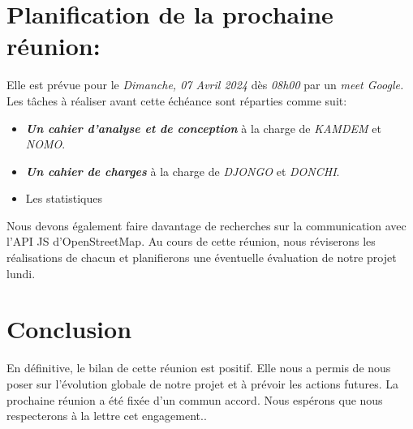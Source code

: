 \documentclass[12px]{article}
\begin{document}
\section{Planification de la prochaine réunion:}
Elle est prévue pour le \textit{Dimanche, 07 Avril 2024} dès \textit{08h00} par un \textit{meet Google.}
Les tâches à réaliser avant cette échéance sont réparties comme suit:
\begin{itemize}
    \item \textbf{\textit{Un cahier d'analyse et de conception}} à la charge de \textit{KAMDEM} et \textit{NOMO}.
    \item \textit{\textbf{Un cahier de charges}} à la charge de \textit{DJONGO} et \textit{DONCHI}.
    \item Les statistiques 
\end{itemize}
Nous devons également faire davantage de recherches sur la communication avec l'API JS d'OpenStreetMap.
Au cours de cette réunion, nous réviserons les réalisations de chacun et planifierons une éventuelle évaluation de notre projet lundi.
\newpage

\section{Conclusion}
En définitive, le bilan de cette réunion est positif. Elle nous a permis de nous poser sur l'évolution globale de notre projet et à prévoir les actions futures. La prochaine réunion a été fixée d'un commun accord. Nous espérons que nous respecterons à la lettre cet engagement..
\end{document}

